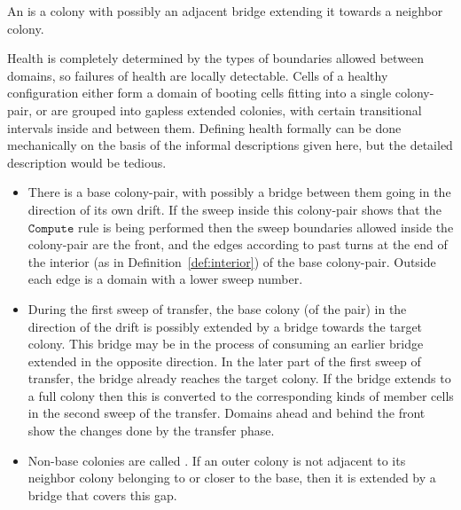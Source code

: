 \documentclass[11pt]{memoir}
\theoremstyle{definition} %
\newtheorem{Premark}{\color{cyan}Peter remark}
\newenvironment{premark}{\begin{Premark}\color{cyan}}{\varqed\end{Premark}}
\newcommand{\rul}[1]{\ensuremath{\texttt{#1}}}
\newcommand{\Comp}{\rul{Compute}}
\begin{document}
\begin{definition}\label{def:extended-colony}
  An  is a colony with possibly an adjacent bridge extending it towards a neighbor colony.
\end{definition}

Health is completely determined by the
types of boundaries allowed between domains, so failures of health are locally detectable.
Cells of a healthy configuration either form a domain of booting cells
fitting into a single colony-pair, or are grouped into gapless extended colonies, with
certain transitional intervals inside and between them.
Defining health formally can be done mechanically on the basis of the informal descriptions given here,
but the detailed description would be tedious.

\begin{itemize}
\item There is a base colony-pair, with possibly a bridge between them going in the direction
  of its own drift.
  If the sweep inside this colony-pair shows that the \( \Comp \) rule is being performed then
  the sweep boundaries allowed inside the colony-pair are the front, and the edges
  according to past turns at the end of the interior (as in Definition~\ref{def:interior})
  of the base colony-pair.
  Outside each edge is a domain with a lower sweep number.

\item  During the first sweep of transfer, the base colony (of the pair)
  in the direction of the drift is possibly extended by a bridge towards the target colony.
  This bridge may be in the process of consuming an earlier bridge extended in the opposite direction.
  In the later part of the first sweep of transfer, the bridge already reaches
  the target colony.
  If the bridge extends to a full colony then this is converted to the corresponding kinds of member
  cells in the second sweep of the transfer.
  Domains ahead and behind the front show the changes done
   by the transfer phase.
  
\item Non-base colonies are called .
If an outer colony is not adjacent to its neighbor colony belonging to or closer to the base,
then it is extended by a bridge that covers this gap.

\end{itemize}
\end{document}
